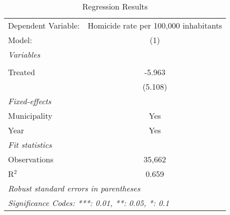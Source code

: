 \documentclass{article}
\begin{document}
\begin{table}[H]
   \caption{Regression Results}
   \centering
   \begin{tabular}{lc}
      \toprule \toprule
      Dependent Variable: & \multicolumn{1}{c}{Homicide rate per 100,000 inhabitants}\\
      Model:              & (1)\\  
      \midrule
      \emph{Variables}\\\\
      Treated             & -5.963\\
                          & (5.108)\\
      \midrule
      \emph{Fixed-effects}\\
      Municipality        & Yes\\
      Year                & Yes\\
      \midrule
      \emph{Fit statistics}\\
      Observations        & 35,662\\
      R$^2$               & 0.659\\
      \midrule \midrule
      \multicolumn{2}{l}{\emph{Robust standard errors in parentheses}}\\
      \multicolumn{2}{l}{\emph{Significance Codes: ***: 0.01, **: 0.05, *: 0.1}}\\
   \end{tabular}
\end{table}
\end{document}
